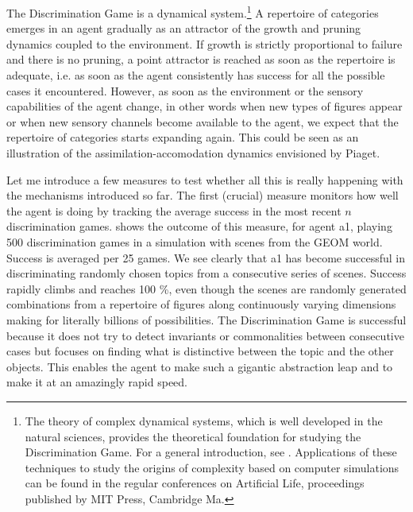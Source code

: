 The Discrimination Game is a dynamical system.\footnote{
The theory of complex dynamical systems, which is well 
developed in the natural sciences, provides the 
theoretical foundation for studying the Discrimination
Game. For a general introduction, see \cite{Peitgen:1992}. 
Applications of these techniques to study the origins
of complexity based on computer simulations 
can be found in the regular conferences on Artificial
Life, proceedings published by MIT Press, Cambridge Ma.} A repertoire of
categories emerges in an agent gradually as an attractor of the
growth and pruning dynamics coupled to 
the environment. If growth is strictly proportional to failure
and there is no pruning, a point attractor
is reached as soon as the repertoire
is adequate, i.e. as soon 
as the agent consistently has success
for all the possible cases it encountered. However, 
as soon as the environment or the sensory capabilities of 
the agent change, in other words when new types of 
figures appear or when new sensory channels become available
to the agent, we expect that the repertoire of categories starts
expanding again. This could be seen as an illustration  of the
assimilation-accomodation dynamics envisioned by Piaget. 

Let me introduce a few measures 
to test whether all this is really happening with the 
mechanisms introduced so far.
The first (crucial) measure monitors 
how well the agent is doing by tracking
the average success in the most recent $n$ discrimination games. 
 shows the outcome of this measure, for 
agent {\bfshape a1}, playing 500 discrimination games in a
simulation with scenes from the GEOM world. 
Success is averaged per 25 games. We see clearly that {\bfshape a1}
has become successful in discriminating randomly chosen topics
from a consecutive series of scenes. Success rapidly climbs and
reaches 100 \%, even though the scenes are randomly
generated combinations from a repertoire of figures
along continuously varying 
dimensions making for literally billions of possibilities. 
The Discrimination Game is successful because it does 
not try to detect invariants or commonalities between consecutive 
cases but focuses on finding what is distinctive between the topic 
and the other objects. This enables the agent to make
such a gigantic abstraction leap and to make it at an amazingly 
rapid speed. 

